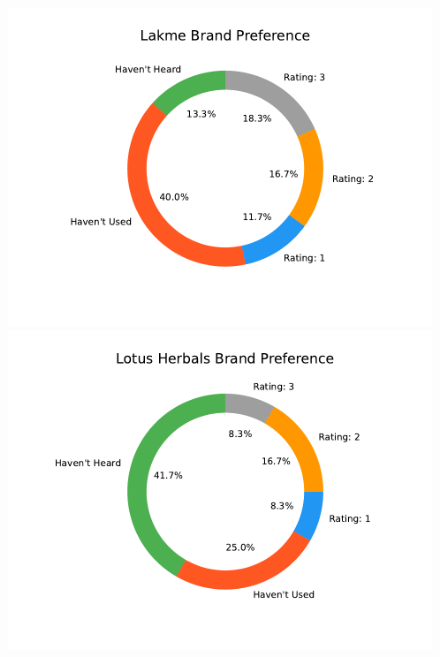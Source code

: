 \documentclass{article}
\begin{document}
\begin{figure}[htbp]
    \centering
    \includegraphics[scale=0.6]{../images/survey-graphs/Lakme-brand-preference.pdf}
    \includegraphics[scale=0.6]{../images/survey-graphs/Lotus Herbals-brand-preference.pdf}
\end{figure}
\end{document}
